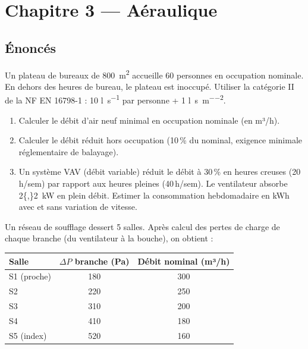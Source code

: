 ﻿\chapter*{Chapitre 3 — Aéraulique}

\section*{Énoncés}


Un plateau de bureaux de \SI{800}{\square\metre} accueille 60 personnes en occupation nominale. En dehors des heures de bureau, le plateau est inoccupé. Utiliser la catégorie II de la NF EN 16798-1 : 10 \si{\litre\per\second} par personne + 1 \si{\litre\per\second\per\square\metre}.

\begin{enumerate}
  \item Calculer le débit d'air neuf minimal en occupation nominale (en m³/h).
  \item Calculer le débit réduit hors occupation (10\,\% du nominal, exigence minimale réglementaire de balayage).
  \item Un système VAV (débit variable) réduit le débit à 30\,\% en heures creuses (20\,h/sem) par rapport aux heures pleines (40\,h/sem). Le ventilateur absorbe \SI{2{,}2}{\kilo\watt} en plein débit. Estimer la consommation hebdomadaire en kWh avec et sans variation de vitesse.
\end{enumerate}



Un réseau de soufflage dessert 5 salles. Après calcul des pertes de charge de chaque branche (du ventilateur à la bouche), on obtient :

\begin{center}
\begin{tabular}{lcc}
  \toprule
  Salle & $\Delta P$ branche (Pa) & Débit nominal (m³/h) \\
  \midrule
  S1 (proche) & 180 & 300 \\
  S2 & 220 & 250 \\
  S3 & 310 & 200 \\
  S4 & 410 & 180 \\
  S5 (index) & 520 & 160 \\
  \bottomrule
\end{tabular}
\end{center}

